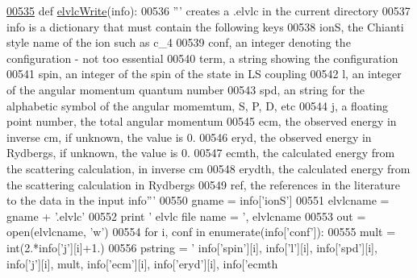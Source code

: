 \begin{DoxyCode}
\hypertarget{namespacepyneb_1_1utils_1_1__chianti__tools_l00535}{}\hyperlink{namespacepyneb_1_1utils_1_1__chianti__tools_a279f0911664046ffd65c19571be8a84d}{00535} \textcolor{keyword}{def }\hyperlink{namespacepyneb_1_1utils_1_1__chianti__tools_a279f0911664046ffd65c19571be8a84d}{elvlcWrite}(info):
00536     \textcolor{stringliteral}{''' creates a .elvlc in the current directory}
00537 \textcolor{stringliteral}{    info is a dictionary that must contain the following keys}
00538 \textcolor{stringliteral}{    ionS, the Chianti style name of the ion such as c\_4}
00539 \textcolor{stringliteral}{    conf, an integer denoting the configuration - not too essential}
00540 \textcolor{stringliteral}{    term, a string showing the configuration}
00541 \textcolor{stringliteral}{    spin, an integer of the spin of the state in LS coupling}
00542 \textcolor{stringliteral}{    l, an integer of the angular momentum quantum number}
00543 \textcolor{stringliteral}{    spd, an string for the alphabetic symbol of the angular momemtum, S, P, D, etc}
00544 \textcolor{stringliteral}{    j, a floating point number, the total angular momentum}
00545 \textcolor{stringliteral}{    ecm, the observed energy in inverse cm, if unknown, the value is 0.}
00546 \textcolor{stringliteral}{    eryd, the observed energy in Rydbergs, if unknown, the value is 0.}
00547 \textcolor{stringliteral}{    ecmth, the calculated energy from the scattering calculation, in inverse cm}
00548 \textcolor{stringliteral}{    erydth, the calculated energy from the scattering calculation in Rydbergs}
00549 \textcolor{stringliteral}{    ref, the references in the literature to the data in the input info'''}
00550     gname = info[\textcolor{stringliteral}{'ionS'}]
00551     elvlcname = gname + \textcolor{stringliteral}{'.elvlc'}
00552     \textcolor{keywordflow}{print} \textcolor{stringliteral}{' elvlc file name = '}, elvlcname
00553     out = open(elvlcname, \textcolor{stringliteral}{'w'})
00554     \textcolor{keywordflow}{for} i,  conf \textcolor{keywordflow}{in} enumerate(info[\textcolor{stringliteral}{'conf'}]):
00555         mult = int(2.*info[\textcolor{stringliteral}{'j'}][i]+1.)
00556         pstring = \textcolor{stringliteral}{'%
      info[\textcolor{stringliteral}{'spin'}][i], info[\textcolor{stringliteral}{'l'}][i], info[\textcolor{stringliteral}{'spd'}][i], info[\textcolor{stringliteral}{'j'}][i], mult, info[\textcolor{stringliteral}{'ecm'}][i], info[\textcolor{stringliteral}{'eryd'}][i], info[\textcolor{stringliteral}{'ecmth
}}
\end{DoxyCode}
